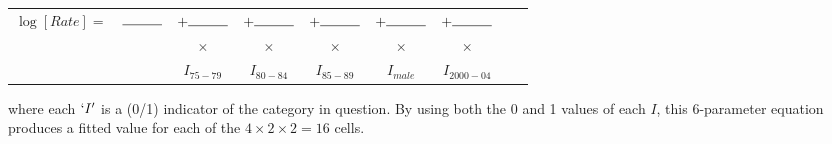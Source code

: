 \documentclass[10pt,handout]{beamer}\usepackage[]{graphicx}\usepackage[]{color}
\begin{document}
\begin{frame}
\begin{tabular}{c c c c c c c c c}
	$\log[Rate] =$ &$\rule{1cm}{0.15mm}$& $+  \rule{1cm}{0.15mm}$ & $+   \rule{1cm}{0.15mm}$ & $+   \rule{1cm}{0.15mm}$ & $+   \rule{1cm}{0.15mm} $ & $+ \rule{1cm}{0.15mm}$ \\
	& &  $\times$  &  $\times$ &  $\times$ & $\times$ & $\times$ & \\
	& &  $I_{75-79}$ & $I_{80-84}$ & $I_{85-89}$ & $I_{male}$ & $I_{2000-04}$ \\
\end{tabular}

where each $`I'$ is a (0/1) indicator of the category in question. By using both the 0 and 1 values of each $I$, this 6-parameter equation  produces a fitted value for each of the $4\times2\times2=16$ cells.

\end{frame}
\end{document}
